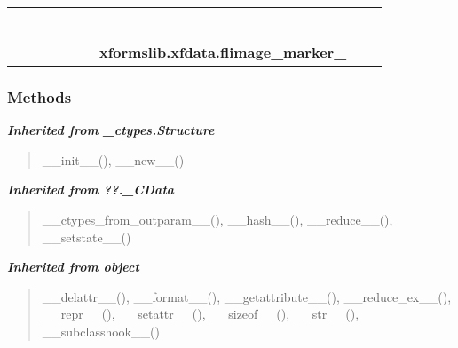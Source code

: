     \label{xformslib:xfdata:flimage_marker_}
\begin{tabular}{cccccccccc}
\multicolumn{2}{r}{\settowidth{\BCL}{object}\multirow{2}{\BCL}{object}}
&&
&&
&&
  \\\cline{3-3}
  &&\multicolumn{1}{c|}{}
&&
&&
&&
  \\
\multicolumn{4}{r}{\settowidth{\BCL}{??.\_CData}\multirow{2}{\BCL}{??.\_CData}}
&&
&&
  \\\cline{5-5}
  &&&&\multicolumn{1}{c|}{}
&&
&&
  \\
\multicolumn{6}{r}{\settowidth{\BCL}{\_ctypes.Structure}\multirow{2}{\BCL}{\_ctypes.Structure}}
&&
  \\\cline{7-7}
  &&&&&&\multicolumn{1}{c|}{}
&&
  \\
&&&&&&\multicolumn{2}{l}{\textbf{xformslib.xfdata.flimage\_marker\_}}
\end{tabular}



  \subsubsection{Methods}


\large{\textbf{\textit{Inherited from \_ctypes.Structure}}}

\begin{quote}
\_\_init\_\_(), \_\_new\_\_()
\end{quote}

\large{\textbf{\textit{Inherited from ??.\_CData}}}

\begin{quote}
\_\_ctypes\_from\_outparam\_\_(), \_\_hash\_\_(), \_\_reduce\_\_(), \_\_setstate\_\_()
\end{quote}

\large{\textbf{\textit{Inherited from object}}}

\begin{quote}
\_\_delattr\_\_(), \_\_format\_\_(), \_\_getattribute\_\_(), \_\_reduce\_ex\_\_(), \_\_repr\_\_(), \_\_setattr\_\_(), \_\_sizeof\_\_(), \_\_str\_\_(), \_\_subclasshook\_\_()
\end{quote}

